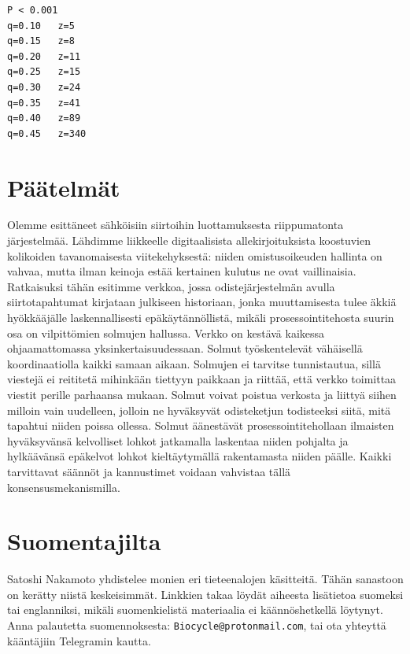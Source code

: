 \documentclass{article}
\begin{document}
\begin{verbatim}
P < 0.001
q=0.10   z=5
q=0.15   z=8
q=0.20   z=11
q=0.25   z=15
q=0.30   z=24
q=0.35   z=41
q=0.40   z=89
q=0.45   z=340
\end{verbatim}

\section{Päätelmät}

Olemme esittäneet sähköisiin siirtoihin luottamuksesta riippumatonta jär\-jes\-tel\-mää. Lähdimme liikkeelle digitaalisista allekirjoituksista koostuvien kolikoiden tavanomaisesta viitekehyksestä: niiden omistusoikeuden hallinta on vahvaa, mutta ilman keinoja estää kertainen kulutus ne ovat vaillinaisia. Ratkaisuksi tähän esitimme verkkoa, jossa odistejärjestelmän avulla siirtotapahtumat kirjataan julkiseen historiaan, jonka muuttamisesta tulee äkkiä hyökkääjälle laskennallisesti epäkäytännöllistä, mikäli prosessointitehosta suurin osa on vilpittömien solmujen hallussa. Verkko on kestävä kaikessa ohjaamattomassa yksinkertaisuudessaan. Solmut työskentelevät vähäisellä koordinaatiolla kaikki samaan aikaan. Solmujen ei tarvitse tunnistautua, sillä viestejä ei reititetä mihinkään tiettyyn paikkaan ja riittää, että verkko toimittaa viestit perille parhaansa mukaan. Solmut voivat poistua verkosta ja liittyä siihen milloin vain uudelleen, jolloin ne hyväksyvät odisteketjun todisteeksi siitä, mitä tapahtui niiden poissa ollessa. Solmut äänestävät prosessointitehollaan ilmaisten hyväksyvänsä kelvolliset lohkot jatkamalla laskentaa niiden pohjalta ja hylkäävänsä epäkelvot lohkot kieltäytymällä rakentamasta niiden päälle. Kaikki tarvittavat säännöt ja kannustimet voidaan vahvistaa tällä konsensusmekanismilla.
\newpage
\printbibliography

\newpage

\section*{Suomentajilta}

Satoshi Nakamoto yhdistelee monien eri tieteenalojen käsitteitä. Tähän sanastoon on kerätty niistä keskeisimmät. Linkkien takaa löydät aiheesta lisätietoa suomeksi tai englanniksi, mikäli suomenkielistä materiaalia ei käännöshetkellä löytynyt. Anna palautetta suomennoksesta: \texttt{Biocycle@protonmail.com}, tai ota yhteyttä kääntäjiin Telegramin kautta.

\glsnogroupskiptrue
\printglossary
\end{document}
